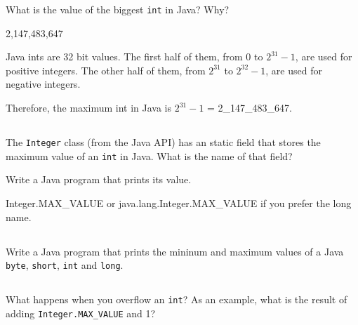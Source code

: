 \documentclass[a4paper, 11pt]{article}
\begin{document}
What is the value of the biggest \texttt{int} in Java?
Why?

\begin{solution}
2,147,483,647

Java ints are 32 bit values. The first half of them, from $0$ to $2^{31}-1$,
are used for positive integers. The other half of them, from $2^{31}$ to
$2^{32}-1$, are used for negative integers.

Therefore, the maximum int in Java is $2^{31}-1$ = 2\_147\_483\_647.
\end{solution}

\subsection{}

The \texttt{Integer} class (from the Java API) has an static field
that stores the maximum value of an \texttt{int} in Java.
What is the name of that field?

Write a Java program that prints its value.

\begin{solution}
Integer.MAX_VALUE or java.lang.Integer.MAX_VALUE if you prefer the long name.
\end{solution}

\subsection{}

Write a Java program that prints the mininum and maximum values of
a Java \texttt{byte}, \texttt{short}, \texttt{int} and \texttt{long}.


\subsection{}

What happens when you overflow an \texttt{int}?
As an example, what is the result of adding \newline
\texttt{Integer.MAX\_VALUE} and 1?


\subsection{}
\end{document}
